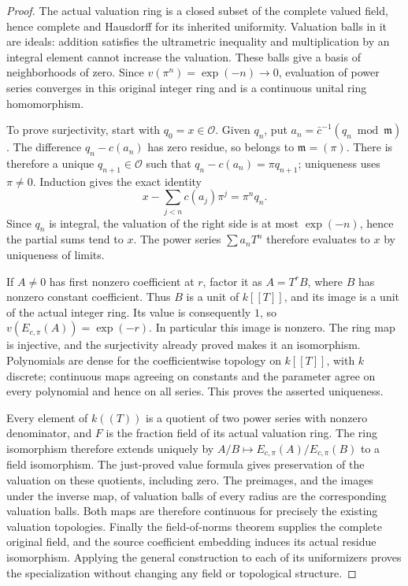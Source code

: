 \begin{proof}
The actual valuation ring is a closed subset of the complete valued field,
hence complete and Hausdorff for its inherited uniformity. Valuation balls
in it are ideals: addition satisfies the ultrametric inequality and
multiplication by an integral element cannot increase the valuation.
These balls give a basis of neighborhoods of zero. Since
$v(\pi^n)=\exp(-n)\to0$, evaluation of power series converges in this
original integer ring and is a continuous unital ring homomorphism.

To prove surjectivity, start with $q_0=x\in\mathcal O$. Given $q_n$, put
$a_n=\bar c^{-1}(q_n\bmod\mathfrak m)$. The difference $q_n-c(a_n)$
has zero residue, so belongs to $\mathfrak m=(\pi)$. There is therefore
a unique $q_{n+1}\in\mathcal O$ such that
$q_n-c(a_n)=\pi q_{n+1}$; uniqueness uses $\pi\ne0$.
Induction gives the exact identity
\[
 x-\sum_{j<n}c(a_j)\pi^j=\pi^nq_n.
\]
Since $q_n$ is integral, the valuation of the right side is at most
$\exp(-n)$, hence the partial sums tend to $x$. The power series
$\sum a_nT^n$ therefore evaluates to $x$ by uniqueness of limits.

If $A\ne0$ has first nonzero coefficient at $r$, factor it as
$A=T^rB$, where $B$ has nonzero constant coefficient. Thus $B$ is a
unit of $k[[T]]$, and its image is a unit of the actual integer ring.
Its value is consequently $1$, so
$v(E_{c,\pi}(A))=\exp(-r)$. In particular this image is nonzero.
The ring map is injective, and the surjectivity already proved makes it
an isomorphism. Polynomials are dense for the coefficientwise topology
on $k[[T]]$, with $k$ discrete; continuous maps agreeing on constants
and the parameter agree on every polynomial and hence on all series.
This proves the asserted uniqueness.

Every element of $k((T))$ is a quotient of two power series with nonzero
denominator, and $F$ is the fraction field of its actual valuation ring.
The ring isomorphism therefore extends uniquely by
$A/B\mapsto E_{c,\pi}(A)/E_{c,\pi}(B)$ to a field isomorphism.
The just-proved value formula gives preservation of the valuation on
these quotients, including zero. The preimages, and the images under
the inverse map, of valuation balls of every radius are the corresponding
valuation balls. Both maps are therefore continuous for precisely the
existing valuation topologies. Finally the field-of-norms theorem supplies
the complete original field, and the source coefficient embedding induces
its actual residue isomorphism. Applying the general construction to each
of its uniformizers proves the specialization without changing any field
or topological structure.
\end{proof}

